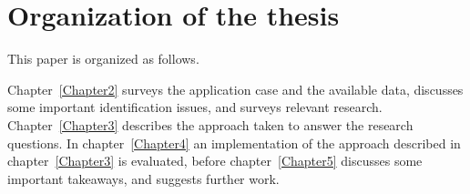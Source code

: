 \section{Organization of the thesis}
\label{intro:thesis_organization}

  This paper is organized as follows.

  Chapter~\ref{Chapter2} surveys the application case and the available data, discusses some important identification issues, and surveys relevant research.
  Chapter~\ref{Chapter3} describes the approach taken to answer the research questions.
  In chapter~\ref{Chapter4} an implementation of the approach described in chapter~\ref{Chapter3} is evaluated, before chapter~\ref{Chapter5} discusses some important takeaways, and suggests further work.
